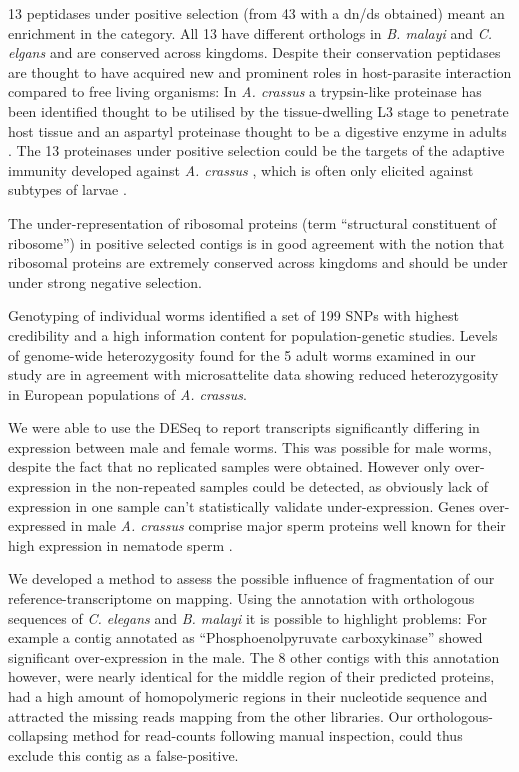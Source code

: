13 peptidases under positive selection (from 43 with a dn/ds obtained)
meant an enrichment in the category. All 13 have different orthologs
in \textit{B. malayi} and \textit{C. elgans} and are conserved across
kingdoms. Despite their conservation peptidases are thought to have
acquired new and prominent roles in host-parasite interaction compared
to free living organisms: In \textit{A. crassus} a trypsin-like
proteinase has been identified thought to be utilised by the
tissue-dwelling L3 stage to penetrate host tissue and an aspartyl
proteinase thought to be a digestive enzyme in adults
\cite{polzer_identification_1993}. The 13 proteinases under positive
selection could be the targets of the adaptive immunity developed
against \textit{A. crassus} \cite{knopf_migratory_2008,
  knopf_vaccination_2008}, which is often only elicited against
subtypes of larvae \cite{molnar_caps}.

The under-representation of ribosomal proteins (term ``structural
constituent of ribosome'') in positive selected contigs is in good
agreement with the notion that ribosomal proteins are extremely
conserved across kingdoms \cite{pmid9664699} and should be under under
strong negative selection.

Genotyping of individual worms identified a set of 199
SNPs with highest credibility and a high information content for
population-genetic studies. Levels of genome-wide heterozygosity found
for the 5 adult worms examined in our study are in agreement with
microsattelite data \cite{wielgoss_population_2008} showing reduced
heterozygosity in European populations of \textit{A. crassus}.

We were able to use the DESeq \cite{pmid20979621} to report
transcripts significantly differing in expression between male and
female worms. This was possible for male worms, despite the fact that
no replicated samples were obtained. However only over-expression in
the non-repeated samples could be detected, as obviously lack of
expression in one sample can't statistically validate
under-expression. Genes over-expressed in male \textit{A. crassus}
comprise major sperm proteins well known for their high expression in
nematode sperm \cite{pmid15275275}.

We developed a method to assess the possible influence of
fragmentation of our reference-transcriptome on mapping. Using the
annotation with orthologous sequences of \textit{C. elegans} and
\textit{B. malayi} it is possible to highlight problems: For example a
contig annotated as ``Phosphoenolpyruvate carboxykinase'' showed
significant over-expression in the male. The 8 other contigs with this
annotation however, were nearly identical for the middle region of
their predicted proteins, had a high amount of homopolymeric regions in
their nucleotide sequence and attracted the missing reads mapping from
the other libraries. Our orthologous-collapsing method for read-counts
following manual inspection, could thus exclude this contig as a
false-positive.

